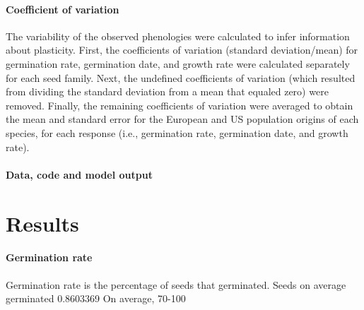 \documentclass[12pt]{article}\usepackage[]{graphicx}\usepackage[]{color}
\begin{document}
	\paragraph{Coefficient of variation} The variability of the observed phenologies were calculated to infer information about plasticity. First, the coefficients of variation (standard deviation/mean) for germination rate, germination date, and growth rate were calculated separately for each seed family. Next, the undefined coefficients of variation (which resulted from dividing the standard deviation from a mean that equaled zero) were removed. Finally, the remaining coefficients of variation were averaged to obtain the mean and standard error for the European and US population origins of each species, for each response (i.e., germination rate, germination date, and growth rate). 
	
	\paragraph{Data, code and model output} 
	\section{Results}
	\paragraph{Germination rate} Germination rate is the percentage of seeds that germinated. Seeds on average germinated 0.8603369 On average, 70-100%
\end{document}
